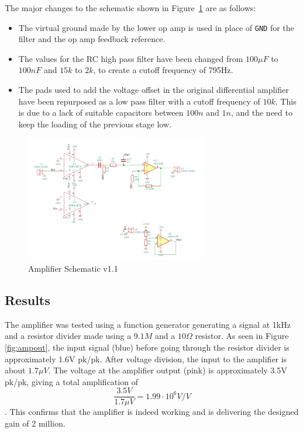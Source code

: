 \documentclass[10pt, journal]{IEEEtran}
\begin{document}
The major changes to the schematic shown in Figure \,\ref{fig:amp11} are as
follows:
\begin{itemize}
\item The virtual ground made by the lower op amp is used in place of
  \texttt{GND} for the filter and the op amp feedback reference.
  
\item The values for the RC high pass filter have been changed from
  $100\mu F$ to $100nF$ and $15k$ to $2k$, to create a cutoff
  frequency of 795Hz.
  
\item The pads used to add the voltage offset in the original
  differential amplifier have been repurposed as a low pass filter
  with a cutoff frequency of $10k$. This is due to a lack of
  suitable capacitors between $100n$ and $1n$, and the need to keep
  the loading of the previous stage low.
\end{itemize}
\begin{figure}[ht!]
  \includegraphics[width=8cm]{../photos/amp11.png}
  \caption{Amplifier Schematic v1.1}
  \label{fig:amp11}
\end{figure}

\subsection{Results}
The amplifier was tested using a function generator generating a
signal at 1kHz and a resistor divider made using a $9.1M$ and a
$10\Omega$ resistor. As seen in Figure \,\ref{fig:ampout}, the input
signal (blue) before going through the resistor divider is approximately 1.6V
pk/pk. After voltage division, the input to the amplifier is about
$1.7\mu V$. The voltage at the amplifier output (pink) is
approximately 3.5V pk/pk, giving a total amplification of
$$\frac{3.5V}{1.7\mu V} = 1.99\cdot 10^6V/V$$. This confirms that the
amplifier is indeed working and is delivering the designed gain of 2
million. 
\end{document}
